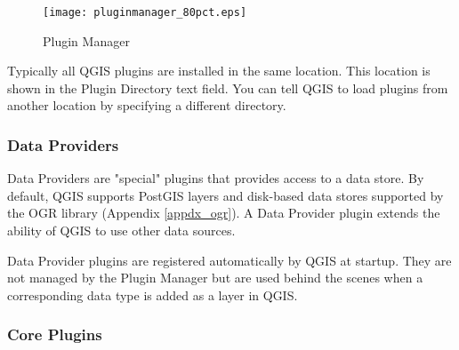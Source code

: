 \begin{figure}[ht]
   \begin{center}
   \caption{Plugin Manager}\label{fig:pluginmanager}\smallskip
   \texttt{[image: pluginmanager\_80pct.eps]}
\end{center}  
\end{figure}

Typically all QGIS plugins are installed in the same location. This location
is shown in the Plugin Directory text field. You can tell QGIS to load plugins
from another location by specifying a different directory.

\begin{Tip}\caption{\textsc{Crashing Plugins}}
\end{Tip} 

\subsubsection{Data Providers}

Data Providers are "special" plugins that provides access to a data store. By
default, QGIS supports PostGIS layers and disk-based data stores supported by
the OGR library (Appendix \ref{appdx_ogr}). A Data Provider plugin extends the
ability of QGIS to use other data sources.

Data Provider plugins are registered automatically by QGIS at startup. They
are not managed by the Plugin Manager but are used behind the scenes when a
corresponding data type is added as a layer in QGIS.

\subsubsection{Core Plugins}

